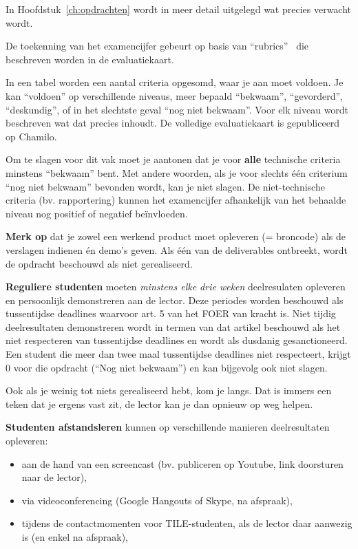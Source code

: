 In Hoofdstuk~\ref{ch:opdrachten} wordt in meer detail uitgelegd wat precies verwacht wordt.

De toekenning van het examencijfer gebeurt op basis van ``rubrics''~\autocite{Andrade2000} die beschreven worden in de evaluatiekaart.

In een tabel worden een aantal criteria opgesomd, waar je aan moet voldoen. Je kan ``voldoen'' op verschillende niveaus, meer bepaald ``bekwaam'', ``gevorderd'', ``deskundig'', of in het slechtste geval ``nog niet bekwaam''. Voor elk niveau wordt beschreven wat dat precies inhoudt. De volledige evaluatiekaart is gepubliceerd op Chamilo.

Om te slagen voor dit vak moet je aantonen dat je voor \textbf{alle} technische criteria minstens ``bekwaam'' bent. Met andere woorden, als je voor slechts één criterium ``nog niet bekwaam'' bevonden wordt, kan je niet slagen. De niet-technische criteria (bv. rapportering) kunnen het examencijfer afhankelijk van het behaalde niveau nog positief of negatief beïnvloeden.

\textbf{Merk op} dat je zowel een werkend product moet opleveren (= broncode) als de verslagen indienen én demo's geven. Als één van de deliverables ontbreekt, wordt de opdracht beschouwd als niet gerealiseerd.

\textbf{Reguliere studenten} moeten \emph{minstens elke drie weken} deelresulaten opleveren en persoonlijk demonstreren aan de lector. Deze periodes worden beschouwd als tussentijdse deadlines waarvoor art. 5 van het FOER van kracht is. Niet tijdig deelresultaten demonstreren wordt in termen van dat artikel beschouwd als het niet respecteren van tussentijdse deadlines en wordt als dusdanig gesanctioneerd. Een student die meer dan twee maal tussentijdse deadlines niet respecteert, krijgt 0 voor die opdracht (``Nog niet bekwaam'') en kan bijgevolg ook niet slagen.

Ook als je weinig tot niets gerealiseerd hebt, kom je langs. Dat is immers een teken dat je ergens vast zit, de lector kan je dan opnieuw op weg helpen.

\textbf{Studenten afstandsleren} kunnen op verschillende manieren deelresultaten opleveren:

\begin{itemize}
  \item aan de hand van een screencast (bv. publiceren op Youtube, link doorsturen naar de lector),
  \item via videoconferencing (Google Hangouts of Skype, na afspraak),
  \item tijdens de contactmomenten voor TILE-studenten, als de lector daar aanwezig is (en enkel na afspraak),
\end{itemize}

